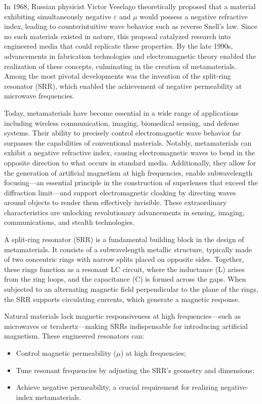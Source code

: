 \documentclass[conference]{IEEEtran}
\begin{document}
In 1968, Russian physicist Victor Veselago theoretically proposed that a material exhibiting simultaneously negative $\varepsilon$ and $\mu$ would possess a negative refractive index, leading to counterintuitive wave behavior such as reverse Snell's law. Since no such materials existed in nature, this proposal catalyzed research into engineered media that could replicate these properties. By the late 1990s, advancements in fabrication technologies and electromagnetic theory enabled the realization of these concepts, culminating in the creation of metamaterials. Among the most pivotal developments was the invention of the split-ring resonator (SRR), which enabled the achievement of negative permeability at microwave frequencies.

Today, metamaterials have become essential in a wide range of applications including wireless communication, imaging, biomedical sensing, and defense systems. Their ability to precisely control electromagnetic wave behavior far surpasses the capabilities of conventional materials. Notably, metamaterials can exhibit a negative refractive index, causing electromagnetic waves to bend in the opposite direction to what occurs in standard media. Additionally, they allow for the generation of artificial magnetism at high frequencies, enable subwavelength focusing—an essential principle in the construction of superlenses that exceed the diffraction limit—and support electromagnetic cloaking by directing waves around objects to render them effectively invisible. These extraordinary characteristics are unlocking revolutionary advancements in sensing, imaging, communications, and stealth technologies.

A split-ring resonator (SRR) is a fundamental building block in the design of metamaterials. It consists of a subwavelength metallic structure, typically made of two concentric rings with narrow splits placed on opposite sides. Together, these rings function as a resonant LC circuit, where the inductance (L) arises from the ring loops, and the capacitance (C) is formed across the gaps. When subjected to an alternating magnetic field perpendicular to the plane of the rings, the SRR supports circulating currents, which generate a magnetic response.

Natural materials lack magnetic responsiveness at high frequencies—such as microwaves or terahertz—making SRRs indispensable for introducing artificial magnetism. These engineered resonators can:


\begin{itemize}
    \item Control magnetic permeability ($\mu$) at high frequencies;
    \item Tune resonant frequencies by adjusting the SRR's geometry and dimensions;
    \item Achieve negative permeability, a crucial requirement for realizing negative-index metamaterials.
\end{itemize}
\end{document}
